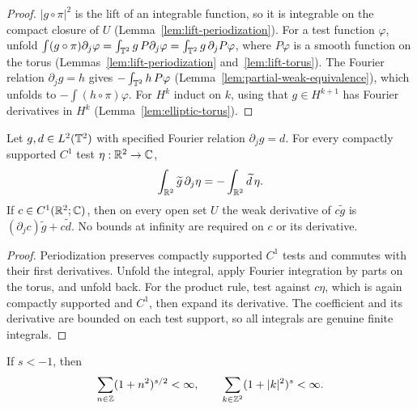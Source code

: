 \begin{proof}
\leanok
$|g\circ\pi|^2$ is the lift of an integrable function, so it is integrable on the compact
closure of $U$ (Lemma~\ref{lem:lift-periodization}). For a test function $\varphi$, unfold
$\int(g\circ\pi)\partial_j\varphi=\int_{\mathbb{T}^2}g\,P\partial_j\varphi
=\int_{\mathbb{T}^2}g\,\partial_jP\varphi$, where $P\varphi$ is a smooth function on the torus
(Lemmas~\ref{lem:lift-periodization} and~\ref{lem:lift-torus}). The Fourier relation
$\partial_jg=h$ gives $-\int_{\mathbb{T}^2}h\,P\varphi$ (Lemma~\ref{lem:partial-weak-equivalence}),
which unfolds to $-\int(h\circ\pi)\varphi$. For $H^k$ induct on $k$, using that
$g\in H^{k+1}$ has Fourier derivatives in $H^k$ (Lemma~\ref{lem:elliptic-torus}).
\end{proof}

\begin{lemma}
\label{lem:fourier-c1-multiplier}
\leanok
Let $g,d\in L^2(\mathbb{T}^2)$ with specified Fourier relation $\partial_jg=d$.
For every compactly supported $C^1$ test $\eta:\mathbb{R}^2\to\mathbb{C}$,
\[
 \int_{\mathbb{R}^2}\widetilde g\,\partial_j\eta
 =-\int_{\mathbb{R}^2}\widetilde d\,\eta.
\]
If $c\in C^1(\mathbb{R}^2;\mathbb{C})$, then on every open set $U$ the weak derivative
of $c\widetilde g$ is $(\partial_jc)\widetilde g+c\widetilde d$.
No bounds at infinity are required on $c$ or its derivative.
\end{lemma}

\begin{proof}
\leanok
Periodization preserves compactly supported $C^1$ tests and commutes with
their first derivatives. Unfold the integral, apply Fourier integration
by parts on the torus, and unfold back. For the product rule, test against
$c\eta$, which is again compactly supported and $C^1$, then expand its
derivative. The coefficient and its derivative are bounded on each test
support, so all integrals are genuine finite integrals.
\end{proof}

\begin{lemma}
\label{lem:sobolev-weight-summable}
\leanok
If $s<-1$, then
\[
  \sum_{n\in\mathbb{Z}}(1+n^2)^{s/2}<\infty,\qquad
  \sum_{k\in\mathbb{Z}^2}(1+|k|^2)^s<\infty .
\]
\end{lemma}

